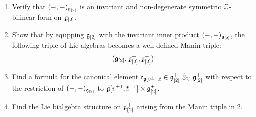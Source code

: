             \begin{question} \label{question: multiloop_lie_bialgebras}
                \begin{enumerate}
                    \item Verify that $(-, -)_{\mathfrak{g}_{[2]}}$ is an invariant and non-degenerate symmetric $\mathbb{C}$-bilinear form on $\mathfrak{g}_{[2]}$.
                    \item Show that by equpping $\mathfrak{g}_{[2]}$ with the invariant inner product $(-, -)_{\mathfrak{g}_{[2]}}$, the following triple of Lie algebras becomes a well-defined Manin triple:
                        $$(\mathfrak{g}_{[2]}, \mathfrak{g}_{[2]}^+, \mathfrak{g}_{[2]}^-)$$
                    \item Find a formula for the canonical element $\sfr_{\g[v^{\pm 1}, t} \in \g_{[2]}^+ \hattensor_{\bbC} \g_{[2]}^+$ with respect to the restriction of $(-, -)_{\mathfrak{g}_{[2]}}$ to $\g[v^{\pm 1}, t^{-1}] \x \g_{[2]}^+$.
                    \item Find the Lie bialgebra structure on $\mathfrak{g}_{[2]}^+$ arising from the Manin triple in 2.
                \end{enumerate}
            \end{question}

